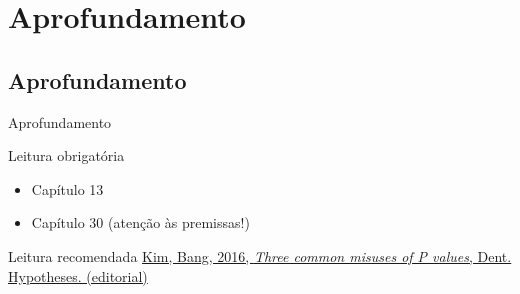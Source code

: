 \documentclass{beamer}
\begin{document}



\section{Aprofundamento}

\subsection{Aprofundamento}

\begin{frame}{\scriptsize Aprofundamento}
  \begin{block}{Leitura obrigatória}
    \begin{itemize}
      \footnotesize
    \item Capítulo 13
    \item Capítulo 30 (atenção às premissas!)
    \end{itemize}
  \end{block}
  \begin{block}{Leitura recomendada}
    \scriptsize
    \href{https://www.ncbi.nlm.nih.gov/pmc/articles/PMC5042133/}{Kim, Bang, 2016, {\em Three common misuses of P values}, Dent. Hypotheses. (editorial)}
  \end{block}
\end{frame}
\end{document}
